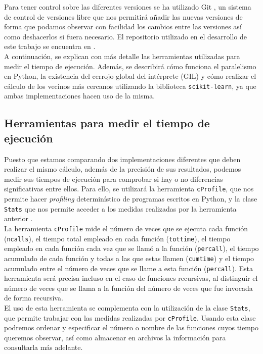 \documentclass[12pt,a4paper]{report} %
\theoremstyle{definition}
\begin{document}
Para tener control sobre las diferentes versiones se ha utilizado Git \cite{git}, un sistema de control de versiones libre que nos permitirá añadir las nuevas versiones de forma que podamos observar con facilidad los cambios entre las versiones así como deshacerlos si fuera necesario. El repositorio utilizado en el desarrollo de este trabajo se encuentra en \cite{sofia}.\\

A continuación, se explican con más detalle las herramientas utilizadas para medir el tiempo de ejecución. Además, se describirá cómo funciona el paralelismo en Python, la existencia del cerrojo global del intérprete (GIL) y cómo realizar el cálculo de los vecinos más cercanos utilizando la biblioteca \texttt{scikit-learn}, ya que ambas implementaciones hacen uso de la misma.\\

\subsection{Herramientas para medir el tiempo de ejecución}

Puesto que estamos comparando dos implementaciones diferentes que deben realizar el mismo cálculo, además de la precisión de sus resultados, podemos medir sus tiempos de ejecución para comprobar si hay o no diferencias significativas entre ellos. Para ello, se utilizará la herramienta \texttt{cProfile}, que nos permite hacer \textit{profiling} determinístico de programas escritos en Python, y la clase \texttt{Stats} que nos permite acceder a los medidas realizadas por la herramienta anterior \cite{profilers}.\\

La herramienta \texttt{cProfile} mide el número de veces que se ejecuta cada función (\texttt{ncalls}), el tiempo total empleado en cada función (\texttt{tottime}), el tiempo empleado en cada función cada vez que se llamó a la función (\texttt{percall}), el tiempo acumulado de cada función y todas a las que estas llamen (\texttt{cumtime}) y el tiempo acumulado entre el número de veces que se llame a esta función (\texttt{percall}). Esta herramienta será precisa incluso en el caso de funciones recursivas, al distinguir el número de veces que se llama a la función del número de veces que fue invocada de forma recursiva.\\

El uso de esta herramienta se complementa con la utilización de la clase \texttt{Stats}, que permite trabajar con las medidas realizadas por \texttt{cProfile}. Usando esta clase podremos ordenar y especificar el número o nombre de las funciones cuyos tiempo queremos observar, así como almacenar en archivos la información para consultarla más adelante.\\
\end{document}
